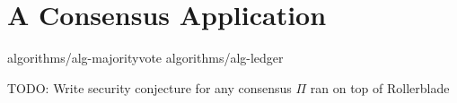 \section{A Consensus Application}\label{sec:consensus}

{algorithms/alg-majorityvote}
{algorithms/alg-ledger}

\begin{conjecture}[Security]
  TODO: Write security conjecture for any consensus $\Pi$ ran on top of Rollerblade
\end{conjecture}

%
